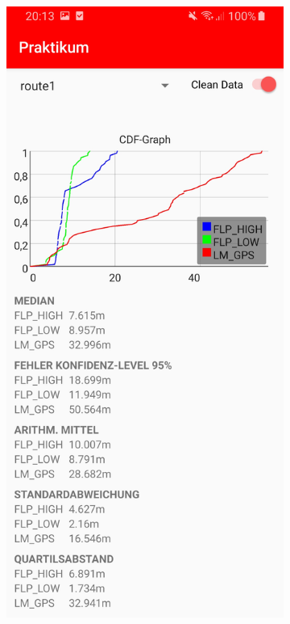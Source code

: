 \begin{figure}[h!]
    \centering
    \begin{subfigure}[b]{0.4\textwidth}
        \includegraphics[width=\textwidth]{screenshot_route1}

\end{subfigure}
\end{figure}
